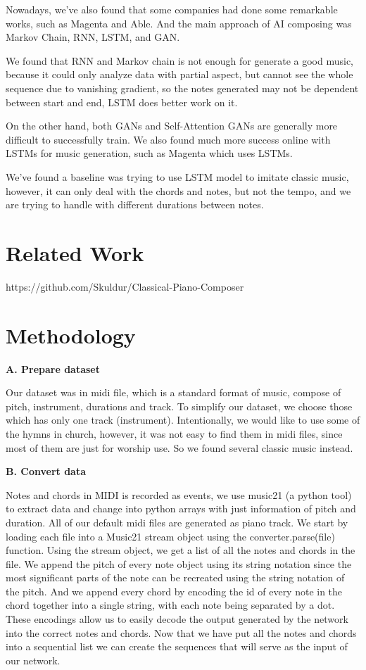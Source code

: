 \documentclass[10pt,twocolumn,letterpaper]{article}
\begin{document}
Nowadays, we’ve also found that some companies had done some remarkable works, such as Magenta and Able. And the main approach of AI composing was Markov Chain, RNN, LSTM, and GAN.

We found that RNN and Markov chain is not enough for generate a good music, because it could only analyze data with partial aspect, but cannot see the whole sequence due to vanishing gradient, so the notes generated may not be dependent between start and end, LSTM does better work on it.

On the other hand, both GANs and Self-Attention GANs are generally more difficult to successfully train. We also found much more success online with LSTMs for music generation, such as Magenta which uses LSTMs.

We’ve found a baseline was trying to use LSTM model to imitate classic music, however, it can only deal with the chords and notes, but not the tempo, and we are trying to handle with different durations between notes.

\section{Related Work}
https://github.com/Skuldur/Classical-Piano-Composer


\section{Methodology}
\noindent
\textbf{A. Prepare dataset}

Our dataset was in midi file, which is a standard format of music, compose of pitch, instrument, durations and track. To simplify our dataset, we choose those which has only one track (instrument). Intentionally, we would like to use some of the hymns in church, however, it was not easy to find them in midi files, since most of them are just for worship use. So we found several classic music instead.

\noindent
\textbf{B. Convert data}

Notes and chords in MIDI is recorded as events, we use music21 (a python tool) to extract data and change into python arrays with just information of pitch and duration. All of our default midi files are generated as piano track. 
We start by loading each file into a Music21 stream object using the converter.parse(file) function. Using the stream object, we get a list of all the notes and chords in the file. We append the pitch of every note object using its string notation since the most significant parts of the note can be recreated using the string notation of the pitch. And we append every chord by encoding the id of every note in the chord together into a single string, with each note being separated by a dot. These encodings allow us to easily decode the output generated by the network into the correct notes and chords.
Now that we have put all the notes and chords into a sequential list we can create the sequences that will serve as the input of our network.
\end{document}
